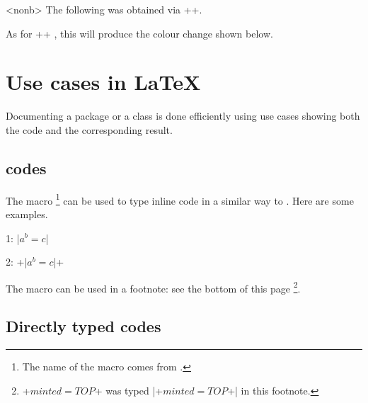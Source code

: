 \begin{tdocexa}<nonb>
    The following was obtained via \tdocinlatex++.

    \medskip


    \medskip

    As for \tdocinlatex++ , this will produce the colour change shown below.

    \medskip

\end{tdocexa}


\section{Use cases in \LaTeX}

Documenting a package or a class is done efficiently using use cases showing both the code and the corresponding result.




\subsection{ codes} \label{tdoc-listing-inline}

The  macro
\footnote{
    The name of the macro  comes from .
}
can be used to type inline code in a similar way to .
Here are some examples.


\begin{tdoclatex}[sbs]
    1: \tdocinlatex|$a^b = c$|

    2: \tdocinlatex+\tdocinlatex|$a^b = c$|+
\end{tdoclatex}


\begin{tdocnote}
    The  macro can be used in a footnote: see the bottom of this page
    \footnote{
        \tdocinlatex+$minted = TOP$+ was typed \tdocinlatex|\tdocinlatex+$minted = TOP$+| in this footnote.
    }.
\end{tdocnote}




\subsection{Directly typed codes}

